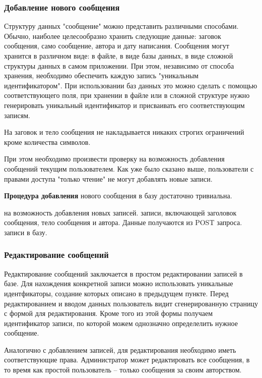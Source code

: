 \documentclass[a4paper]{article}
\begin{document}
\subsubsection{Добавление нового сообщения}

Структуру данных "сообщение" можно представить различными способами. Обычно, наиболее целесообразно хранить следующие данные: заговок сообщения, само сообщение, автора и дату написания. Сообщения могут хранится в различном виде: в файле, в виде базы данных, в виде сложной структуры данных в самом приложении. При этом, независимо от способа хранения, необходимо обеспечить каждую запись "уникальным идентификатором". При использовании баз данных это можно сделать с помощью соответствующего поля, при хранении в файле или в сложной структуре нужно генерировать уникальный идентификатор и присваивать его соответствующим записям.

На заговок и тело сообщения не накладывается никаких строгих ограничений кроме количества символов.

При этом необходимо произвести проверку на возможность добавления сообщений текущим пользователем. Как уже было сказано выше, пользователи с правами доступа "только чтение" не могут добавлять новые записи.

\textbf{Процедура добавления} нового сообщения в базу достаточно тривиальна.

\begin{enumerate}
 на возможность добавления новых записей.
 записи, включающей заголовок сообщения, тело сообщения и автора. Данные получаются из POST запроса.
 записи в базу.
\end{enumerate}

\subsubsection{Редактирование сообщений}

Редактирование сообщений заключается в простом редактировании записей в базе. Для нахождения конкретной записи можно использовать уникальные идентфикаторы, создание которых описано в предыдущем пункте. Перед редактированием и вводом данных пользователь видит сгенерированную страницу с формой для редактирования. Кроме того из этой формы получаем идентификатор записи, по которой можем однозначно определелить нужное сообщение.

Аналогично с добавлением записей, для редактирования необходимо иметь соответствующие права. Администратор может редактировать все сообщения, в то время как простой пользователь -- только сообщения за своим авторством.
\end{document}
